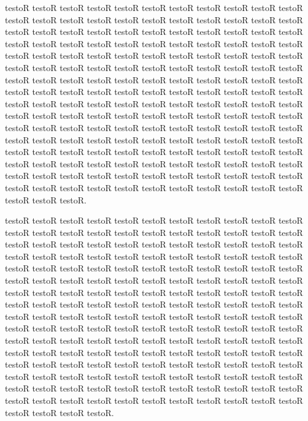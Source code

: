 \documentclass[11pt,a4paper]{book}
\begin{document}
\begin{pages}
\begin{Rightside}
\pstart testoR testoR testoR testoR testoR testoR testoR testoR testoR testoR testoR testoR testoR testoR testoR testoR testoR testoR testoR testoR testoR testoR testoR testoR testoR testoR testoR testoR testoR testoR testoR testoR testoR testoR testoR testoR testoR testoR testoR testoR testoR testoR testoR testoR testoR testoR testoR testoR testoR testoR testoR testoR testoR testoR testoR testoR testoR testoR testoR testoR testoR testoR testoR testoR testoR testoR testoR testoR testoR testoR testoR testoR testoR testoR testoR testoR testoR testoR testoR testoR testoR testoR testoR testoR testoR testoR testoR testoR testoR testoR testoR testoR testoR testoR testoR testoR testoR testoR testoR testoR testoR testoR testoR testoR testoR testoR testoR testoR testoR testoR testoR testoR testoR testoR testoR testoR testoR testoR testoR testoR testoR testoR testoR testoR testoR testoR testoR testoR testoR testoR testoR testoR testoR testoR testoR testoR testoR testoR testoR testoR testoR testoR testoR testoR testoR testoR testoR testoR testoR testoR testoR testoR testoR testoR testoR testoR testoR testoR testoR testoR testoR testoR testoR testoR testoR testoR testoR testoR testoR testoR testoR testoR testoR testoR testoR testoR testoR testoR testoR.\pend

\pstart testoR testoR testoR testoR testoR testoR testoR testoR testoR testoR testoR testoR testoR testoR testoR testoR testoR testoR testoR testoR testoR testoR testoR testoR testoR testoR testoR testoR testoR testoR testoR testoR testoR testoR testoR testoR testoR testoR testoR testoR testoR testoR testoR testoR testoR testoR testoR testoR testoR testoR testoR testoR testoR testoR testoR testoR testoR testoR testoR testoR testoR testoR testoR testoR testoR testoR testoR testoR testoR testoR testoR testoR testoR testoR testoR testoR testoR testoR testoR testoR testoR testoR testoR testoR testoR testoR testoR testoR testoR testoR testoR testoR testoR testoR testoR testoR testoR testoR testoR testoR testoR testoR testoR testoR testoR testoR testoR testoR testoR testoR testoR testoR testoR testoR testoR testoR testoR testoR testoR testoR testoR testoR testoR testoR testoR testoR testoR testoR testoR testoR testoR testoR testoR testoR testoR testoR testoR testoR testoR testoR testoR testoR testoR testoR testoR testoR testoR testoR testoR testoR testoR testoR testoR testoR testoR testoR testoR testoR testoR testoR testoR testoR testoR testoR testoR testoR testoR testoR testoR testoR testoR testoR testoR testoR testoR testoR testoR testoR testoR testoR.\pend

\endnumbering
\end{Rightside}
\Pages
\end{pages}
\end{document}
